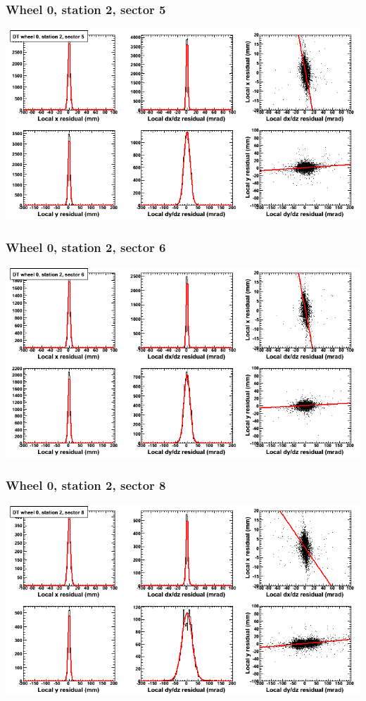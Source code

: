 \documentclass[compress]{beamer}
\begin{document}
\begin{frame}
\frametitle{Wheel 0, station 2, sector 5}
\includegraphics[width=\linewidth]{tmpbell_MBwhCst2sec05.png}
\end{frame}

\begin{frame}
\frametitle{Wheel 0, station 2, sector 6}
\includegraphics[width=\linewidth]{tmpbell_MBwhCst2sec06.png}
\end{frame}

\begin{frame}
\frametitle{Wheel 0, station 2, sector 8}
\includegraphics[width=\linewidth]{tmpbell_MBwhCst2sec08.png}
\end{frame}
\end{document}
